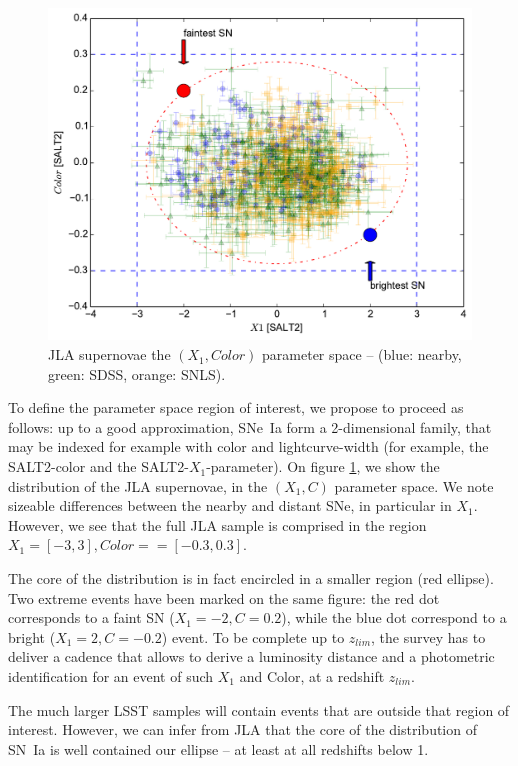 \documentclass[\docopts]{\docclass}
\begin{document}
\begin{figure}[t]
\begin{center}
\includegraphics[width=0.75\linewidth]{sn_parameter_space.pdf}
\caption{JLA supernovae the $(X_1,Color)$ parameter space -- (blue:
  nearby, green: SDSS, orange: SNLS).  }
\label{fig:jla_X1_C}
\end{center}
\end{figure}

To define the parameter space region of interest, we propose to
proceed as follows: up to a good approximation, SNe~Ia form a
2-dimensional family, that may be indexed for example with color and
lightcurve-width (for example, the SALT2-color and the
SALT2-$X_1$-parameter).  On figure \ref{fig:jla_X1_C}, we show the
distribution of the JLA supernovae, in the $(X_1,C)$ parameter
space. We note sizeable differences between the nearby and distant
SNe, in particular in $X_1$.  However, we see that the full JLA sample
is comprised in the region $X_1 = [-3,3], Color= = [-0.3, 0.3]$. 

The core of the distribution is in fact encircled in a smaller region
(red ellipse). Two extreme events have been marked on the same figure:
the red dot corresponds to a faint SN ($X_1=-2, C=0.2$), while the
blue dot correspond to a bright ($X_1=2, C=-0.2$) event. To be
complete up to $z_{lim}$, the survey has to deliver a cadence that
allows to derive a luminosity distance and a photometric
identification for an event of such $X_1$ and Color, at a redshift
$z_{lim}$. 

The much larger LSST samples will contain events that are outside that
region of interest.  However, we can infer from JLA that the core of
the distribution of SN~Ia is well contained our ellipse -- at least at
all redshifts below 1.
\end{document}
